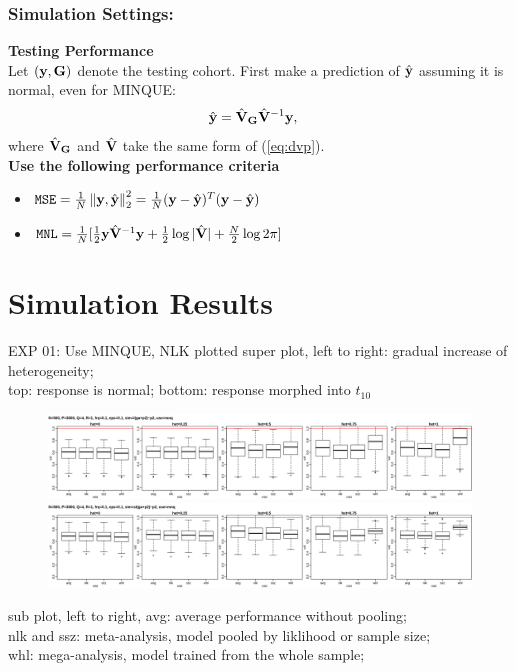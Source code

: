 \documentclass{beamer}
\begin{document}
\begin{frame}
  \frametitle{Simulation Settings:} %
  \textbf{Testing Performance} \\
  Let $(\mathbf{y}, \mathbf{G})$ denote the testing cohort. First make a prediction
  of $\hat{\mathbf{y}}$ assuming it is normal, even for MINQUE:
  \begin{align}
    \begin{split}
      \hat{\mathbf{y}} &= \hat{\mathbf{V}}_\mathbf{G} \hat{\mathbf{V}}^{-1} \mathbf{y},
    \end{split}
  \end{align}
  where $\hat{\mathbf{V}}_\mathbf{G}$ and $\hat{\mathbf{V}}$ take the same form of (\ref{eq:dvp}).\\
  \textbf{Use the following performance criteria}
  \begin{itemize}
  \item $\mathtt{MSE} = \frac{1}{N} \left\lVert\mathbf{y}, \hat{\mathbf{y}}\right\rVert_2^2 = \frac{1}{N} (\mathbf{y}-\hat{\mathbf{y}})^T(\mathbf{y}-\hat{\mathbf{y}})$
  \item
    $\mathtt{MNL} = \frac{1}{N} [\frac{1}{2}\mathbf{y}\hat{\mathbf{V}}^{-1}\mathbf{y} +
    \frac{1}{2}\log{|\hat{\mathbf{V}}|} + \frac{N}{2}\log{2\pi}]$
  \end{itemize}
\end{frame}
\section{Simulation Results}
\begin{frame}{EXP 01: Use MINQUE, NLK plotted}
  \scriptsize super plot, left to right: gradual increase of heterogeneity;\\
  top: response is normal; bottom: response morphed into $t_{10}$ \\
  \normalsize
  \begin{figure}
    \includegraphics[width=\linewidth]{km2_mnq_s01.png} \\
    \includegraphics[width=\linewidth]{km2_mnq_s02.png}
  \end{figure}
  \tiny sub plot, left to right, avg: average performance without pooling;\\
  nlk and ssz: meta-analysis, model pooled by liklihood or sample size; \\
  whl: mega-analysis, model trained from the whole sample;
\end{frame}
\end{document}
